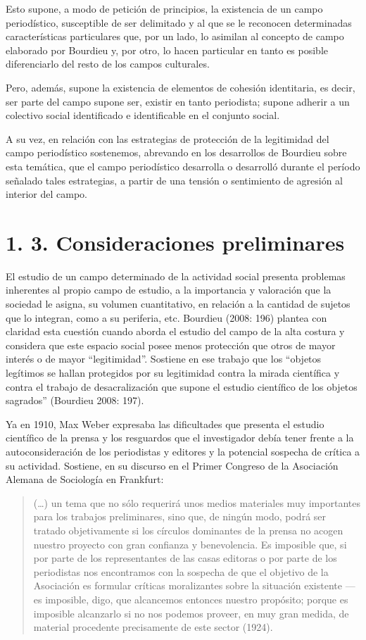 Esto supone, a modo de petición de principios, la existencia de un campo periodístico, susceptible de ser delimitado y al que se le reconocen determinadas características particulares que, por un lado, lo asimilan al concepto de campo elaborado por Bourdieu y, por otro, lo hacen particular en tanto es posible diferenciarlo del resto de los campos culturales.

Pero, además, supone la existencia de elementos de cohesión identitaria, es decir, ser parte del campo supone ser, existir en tanto periodista; supone adherir a un colectivo social identificado e identificable en el conjunto social.

A su vez, en relación con las estrategias de protección de la legitimidad del campo periodístico sostenemos, abrevando en los desarrollos de Bourdieu sobre esta temática, que el campo periodístico desarrolla o desarrolló durante el período señalado tales estrategias, a partir de una tensión o sentimiento de agresión al interior del campo.


\section{1. 3. Consideraciones preliminares}

El estudio de un campo determinado de la actividad social presenta problemas inherentes al propio campo de estudio, a la importancia y valoración que la sociedad le asigna, su volumen cuantitativo, en relación a la cantidad de sujetos que lo integran, como a su periferia, etc. Bourdieu (2008: 196) plantea con claridad esta cuestión cuando aborda el estudio del campo de la alta costura y considera que este espacio social posee menos protección que otros de mayor interés o de mayor ``legitimidad''. Sostiene en ese trabajo que los ``objetos legítimos se hallan protegidos por su legitimidad contra la mirada científica y contra el trabajo de desacralización que supone el estudio científico de los objetos sagrados'' (Bourdieu 2008: 197).

Ya en 1910, Max Weber expresaba las dificultades que presenta el estudio científico de la prensa y los resguardos que el investigador debía tener frente a la autoconsideración de los periodistas y editores y la potencial sospecha de crítica a su actividad. Sostiene, en su discurso en el Primer Congreso de la Asociación Alemana de Sociología en Frankfurt:

\begin{quote}
(\ldots) un tema que no sólo requerirá unos medios materiales muy importantes para los trabajos preliminares, sino que, de ningún modo, podrá ser tratado objetivamente si los círculos dominantes de la prensa no acogen nuestro proyecto con gran confianza y benevolencia. Es imposible que, si por parte de los representantes de las casas editoras o por parte de los periodistas nos encontramos con la sospecha de que el objetivo de la Asociación es formular críticas moralizantes sobre la situación existente ---es imposible, digo, que alcancemos entonces nuestro propósito; porque es imposible alcanzarlo si no nos podemos proveer, en muy gran medida, de material procedente precisamente de este sector (1924).
\end{quote}

